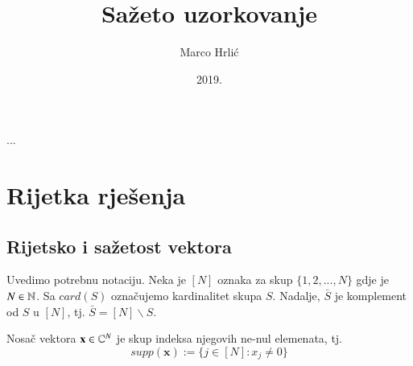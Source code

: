 \documentclass[a4paper,twoside,12pt]{memoir} %
\title{Sa\v{z}eto uzorkovanje}
\author{Marco Hrli\'c}
\date{2019.}  %
\newcommand{\vect}[1]{\mathbf{#1}}
\begin{document}
\frontmatter


\begin{intro}
...
\end{intro}

\chapter[Rijetka rje\v{s}enja][Rijetka rje\v{s}enja]{Rijetka rje\v{s}enja}	

\section[Rijetsko i sa\v{z}etost vektora][Rijetsko i sa\v{z}etost vektora]{Rijetsko i sa\v{z}etost vektora}
Uvedimo potrebnu notaciju. Neka je $[N]$ oznaka za skup $\{1,2,...,N\}$ gdje je $N\in\mathbb{N}$. Sa $card(S)$ ozna\v{c}ujemo kardinalitet skupa $S$. Nadalje, $\bar{S}$ je komplement od $S$ u $[N]$, tj. $\bar{S}=[N]\backslash S$.

\begin{defn}
    Nosa\v{c} vektora $\vect{x} \in \C^{N}$ je skup indeksa njegovih ne-nul elemenata, tj.
    $$supp(\vect{x}):=\{j\in[N]:x_j \neq 0 \}$$
\end{defn}
\end{document}
